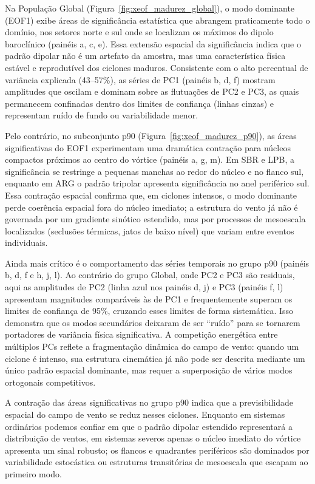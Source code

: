 Na População Global (Figura~\ref{fig:xeof_madurez_global}), o modo dominante (EOF1) exibe áreas de significância estatística que abrangem praticamente todo o domínio, nos setores norte e sul onde se localizam os máximos do dipolo baroclínico (painéis a, c, e).
Essa extensão espacial da significância indica que o padrão dipolar não é um artefato da amostra, mas uma característica física estável e reprodutível dos ciclones maduros.
Consistente com o alto percentual de variância explicada (43--57\%), as séries de PC1 (painéis b, d, f) mostram amplitudes que oscilam e dominam sobre as flutuações de PC2 e PC3, as quais permanecem confinadas dentro dos limites de confiança (linhas cinzas) e representam ruído de fundo ou variabilidade menor.

Pelo contrário, no subconjunto p90 (Figura~\ref{fig:xeof_madurez_p90}), as áreas significativas do EOF1 experimentam uma dramática contração para núcleos compactos próximos ao centro do vórtice (painéis a, g, m).
Em SBR e LPB, a significância se restringe a pequenas manchas ao redor do núcleo e no flanco sul, enquanto em ARG o padrão tripolar apresenta significância no anel periférico sul.
Essa contração espacial confirma que, em ciclones intensos, o modo dominante perde coerência espacial fora do núcleo imediato; a estrutura do vento já não é governada por um gradiente sinótico estendido, mas por processos de mesoescala localizados (seclusões térmicas, jatos de baixo nível) que variam entre eventos individuais.

Ainda mais crítico é o comportamento das séries temporais no grupo p90 (painéis b, d, f e h, j, l). Ao contrário do grupo Global, onde PC2 e PC3 são residuais, aqui as amplitudes de PC2 (linha azul nos painéis d, j) e PC3 (painéis f, l) apresentam magnitudes comparáveis às de PC1 e frequentemente superam os limites de confiança de 95\%, cruzando esses limites de forma sistemática.
Isso demonstra que os modos secundários deixaram de ser ``ruído'' para se tornarem portadores de variância física significativa.
A competição energética entre múltiplos PCs reflete a fragmentação dinâmica do campo de vento: quando um ciclone é intenso, sua estrutura cinemática já não pode ser descrita mediante um único padrão espacial dominante, mas requer a superposição de vários modos ortogonais competitivos.

A contração das áreas significativas no grupo p90 indica que a previsibilidade espacial do campo de vento se reduz nesses ciclones.
Enquanto em sistemas ordinários podemos confiar em que o padrão dipolar estendido representará a distribuição de ventos, em sistemas severos apenas o núcleo imediato do vórtice apresenta um sinal robusto; os flancos e quadrantes periféricos são dominados por variabilidade estocástica ou estruturas transitórias de mesoescala que escapam ao primeiro modo.

